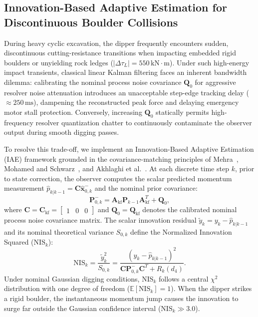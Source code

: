 \documentclass[journal]{IEEEtran}
\begin{document}
\subsection{Innovation-Based Adaptive Estimation for Discontinuous Boulder Collisions}
During heavy cyclic excavation, the dipper frequently encounters sudden, discontinuous cutting-resistance transitions when impacting embedded rigid boulders or unyielding rock ledges ($|\Delta \tau_L| = 550\,\mathrm{kN\cdot m}$). Under such high-energy impact transients, classical linear Kalman filtering faces an inherent bandwidth dilemma: calibrating the nominal process noise covariance $\bm{Q}_0$ for aggressive resolver noise attenuation introduces an unacceptable step-edge tracking delay ($\approx 250\,\mathrm{ms}$), dampening the reconstructed peak force and delaying emergency motor stall protection. Conversely, increasing $\bm{Q}_0$ statically permits high-frequency resolver quantization chatter to continuously contaminate the observer output during smooth digging passes.

To resolve this trade-off, we implement an Innovation-Based Adaptive Estimation (IAE) framework grounded in the covariance-matching principles of Mehra~\cite{mehra1970identification}, Mohamed and Schwarz~\cite{mohamed1999adaptive}, and Akhlaghi et al.~\cite{akhlaghi2017adaptive}. At each discrete time step $k$, prior to state correction, the observer computes the scalar predicted momentum measurement $\hat{p}_{k|k-1} = \bm{C}\hat{\bm{x}}^-_{0,k}$ and the nominal prior covariance:
\begin{equation}
\bm{P}^-_{0,k} = \bm{A}_{\mathrm{kf}}\bm{P}_{k-1}\bm{A}_{\mathrm{kf}}^T + \bm{Q}_0,
\end{equation}
where $\bm{C} = \bm{C}_{\mathrm{kf}} = \begin{bmatrix} 1 & 0 & 0 \end{bmatrix}$ and $\bm{Q}_0 = \bm{Q}_{\mathrm{kf}}$ denotes the calibrated nominal process noise covariance matrix. The scalar innovation residual $\tilde{y}_k = y_k - \hat{p}_{k|k-1}$ and its nominal theoretical variance $S_{0,k}$ define the Normalized Innovation Squared ($\mathrm{NIS}_k$):
\begin{equation}
\mathrm{NIS}_k = \frac{\tilde{y}_k^2}{S_{0,k}} = \frac{(y_k - \hat{p}_{k|k-1})^2}{\bm{C}\bm{P}^-_{0,k}\bm{C}^T + R_k(d_4)}.
\label{eq:nis_gate}
\end{equation}
Under nominal Gaussian digging conditions, $\mathrm{NIS}_k$ follows a central $\chi^2$ distribution with one degree of freedom ($\mathbb{E}[\mathrm{NIS}_k] = 1$). When the dipper strikes a rigid boulder, the instantaneous momentum jump causes the innovation to surge far outside the Gaussian confidence interval ($\mathrm{NIS}_k \gg 3.0$).
\end{document}
